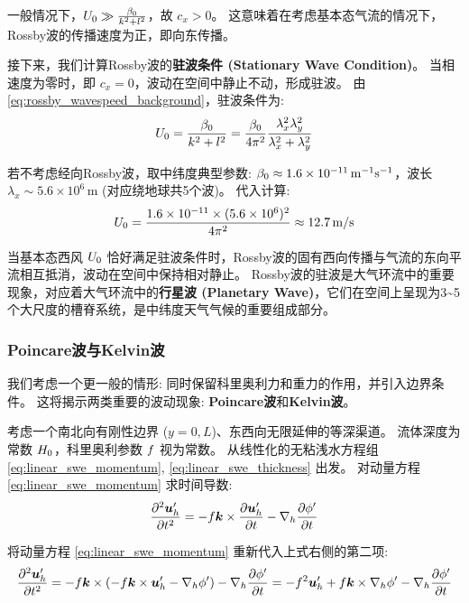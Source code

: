 一般情况下，$U_0 \gg \frac{\beta_0}{k^2 + l^2}$，故 $c_x > 0$。
这意味着在考虑基本态气流的情况下，Rossby波的传播速度为正，即向东传播。

接下来，我们计算Rossby波的\textbf{驻波条件 (Stationary Wave Condition)}。
当相速度为零时，即 $c_x = 0$，波动在空间中静止不动，形成驻波。
由 \eqref{eq:rossby_wavespeed_background}，驻波条件为:
\begin{equation}
    U_0 = \frac{\beta_0}{k^2 + l^2} = \frac{\beta_0}{4\pi^2} \frac{\lambda_x^2 \lambda_y^2}{\lambda_x^2 + \lambda_y^2}
    \label{eq:stationary_wave_condition}
\end{equation}

若不考虑经向Rossby波，取中纬度典型参数: $\beta_0 \approx 1.6 \times 10^{-11}\,\mathrm{m^{-1} s^{-1}}$，波长 $\lambda_x \sim 5.6 \times 10^6\,\mathrm{m}$ (对应绕地球共5个波)。
代入计算:
\begin{equation*}
    U_0 = \frac{1.6 \times 10^{-11} \times (5.6 \times 10^6)^2}{4\pi^2} \approx 12.7\,\mathrm{m/s}
\end{equation*}

当基本态西风 $U_0$ 恰好满足驻波条件时，Rossby波的固有西向传播与气流的东向平流相互抵消，波动在空间中保持相对静止。
Rossby波的驻波是大气环流中的重要现象，对应着大气环流中的\textbf{行星波 (Planetary Wave)}，它们在空间上呈现为3\textasciitilde5个大尺度的槽脊系统，是中纬度天气气候的重要组成部分。

\subsubsection{Poincare波与Kelvin波}

我们考虑一个更一般的情形: 同时保留科里奥利力和重力的作用，并引入边界条件。
这将揭示两类重要的波动现象: \textbf{Poincare波}和\textbf{Kelvin波}。

考虑一个南北向有刚性边界 ($y = 0, L$)、东西向无限延伸的等深渠道。
流体深度为常数 $H_0$，科里奥利参数 $f$ 视为常数。
从线性化的无粘浅水方程组 \eqref{eq:linear_swe_momentum}, \eqref{eq:linear_swe_thickness} 出发。
对动量方程 \eqref{eq:linear_swe_momentum} 求时间导数:
\begin{equation*}
    \pde[2]{\vel_h^\prime}{\timevar} = -\coriolis \kvec \times \pde{\vel_h^\prime}{\timevar} - \nabla_h \pde{\gravpotential^\prime}{\timevar}
\end{equation*}

将动量方程 \eqref{eq:linear_swe_momentum} 重新代入上式右侧的第二项:
\begin{equation}
    \pde[2]{\vel_h^\prime}{\timevar} = -\coriolis \kvec \times (-\coriolis \kvec \times \vel_h^\prime - \nabla_h \gravpotential^\prime) - \nabla_h \pde{\gravpotential^\prime}{\timevar} = -\coriolis^2 \vel_h^\prime + \coriolis \kvec \times \nabla_h \gravpotential^\prime - \nabla_h \pde{\gravpotential^\prime}{\timevar}
    \label{eq:vel_phi}
\end{equation}

